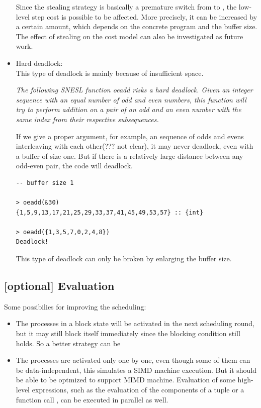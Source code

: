 \begin{itemize}
Since the stealing strategy is basically a premature
switch from \filling to \draining, the low-level step cost is possible to be affected. More precisely,  it can be increased by a certain amount, which depends on the concrete program and the buffer size. 
The effect of stealing on the cost model can also be investigated as future work.


\item Hard deadlock: \\

This type of deadlock is mainly because of insufficient space.

\begin{example} \emph{The following SNESL function {\ttfamily oeadd} risks a hard deadlock. Given an integer sequence with an equal number of odd and even numbers, this function will try to perform addition on a pair of an odd and an even number with the same index from their respective subsequences.} 
\end{example}

 
\hspace{0.3cm}

If we give a proper argument, for example, an sequence of odds and evens interleaving with each other(??? not clear), it may never deadlock, even with a buffer of size one. 
But if there is a relatively large distance between any odd-even pair, the code will deadlock.  \\
  
\begin{lstlisting}[style=nesl-style]
-- buffer size 1

> oeadd(&30)
{1,5,9,13,17,21,25,29,33,37,41,45,49,53,57} :: {int}

> oeadd({1,3,5,7,0,2,4,8})
Deadlock!
\end{lstlisting}


This type of deadlock can only be broken by enlarging the buffer size. 


\end{itemize}


\subsection{[optional] Evaluation}
Some possibilies for improving the scheduling:

\begin{itemize}
\item The processes in a block state will be activated in the next scheduling round, but it may still  block itself immediately since the blocking condition still holds. So a better strategy can be 

\item The processes are activated only one by one, even though some of them can be data-independent, this simulates a SIMD machine execution. But it should be able to be optmized to support MIMD machine. 
Evaluation of some high-level expressions, such as the evaluation of the components of a tuple or a function call , can be executed in parallel as well.


\end{itemize}


